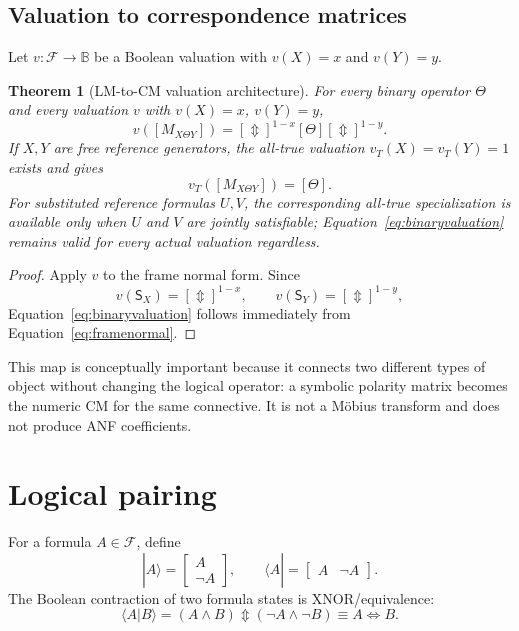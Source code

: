 \documentclass[11pt]{article}
\newtheorem{theorem}{Theorem}[section]
\theoremstyle{definition}
\theoremstyle{remark}
\newcommand{\B}{\mathbb B}
\newcommand{\cF}{\mathcal F}
\newcommand{\xor}{\mathbin{\Updownarrow}}
\begin{document}
\subsection{Valuation to correspondence matrices}

Let $v:\cF\to\B$ be a Boolean valuation with $v(X)=x$ and $v(Y)=y$.
\begin{theorem}[LM-to-CM valuation architecture]
For every binary operator $\Theta$ and every valuation $v$ with $v(X)=x$, $v(Y)=y$,
\begin{equation}
 v([M_{X\Theta Y}])
 =[\Updownarrow]^{1-x}[\Theta][\Updownarrow]^{1-y}.
 \label{eq:binaryvaluation}
\end{equation}
If $X,Y$ are free reference generators, the all-true valuation $v_T(X)=v_T(Y)=1$ exists and gives
\[
 v_T([M_{X\Theta Y}])=[\Theta].
\]
For substituted reference formulas $U,V$, the corresponding all-true specialization is available only when $U$ and $V$ are jointly satisfiable; Equation~\eqref{eq:binaryvaluation} remains valid for every actual valuation regardless.
\end{theorem}
\begin{proof}
Apply $v$ to the frame normal form.  Since
\[
 v(\mathsf S_X)=[\Updownarrow]^{1-x},\qquad
 v(\mathsf S_Y)=[\Updownarrow]^{1-y},
\]
Equation~\eqref{eq:binaryvaluation} follows immediately from Equation~\eqref{eq:framenormal}.
\end{proof}

This map is conceptually important because it connects two different types of object without changing the logical operator: a symbolic polarity matrix becomes the numeric CM for the same connective.  It is not a M\"obius transform and does not produce ANF coefficients.

\section{Logical pairing}
\label{sec:pairing}

For a formula $A\in\cF$, define
\[
 |A\rangle=\begin{bmatrix}A\\\neg A\end{bmatrix},\qquad
 \langle A|=\begin{bmatrix}A&\neg A\end{bmatrix}.
\]
The Boolean contraction of two formula states is XNOR/equivalence:
\begin{equation}
 \langle A|B\rangle=(A\land B)\xor(\neg A\land\neg B)
 \equiv A\Leftrightarrow B.
 \label{eq:equivpair}
\end{equation}
\end{document}

